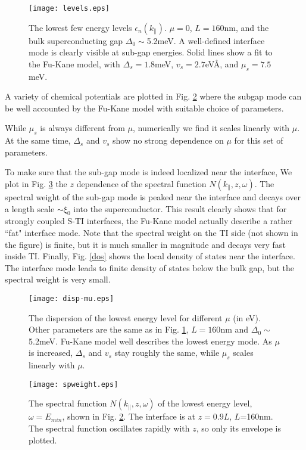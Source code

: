 \documentclass[12pt,twocolumn]{article}
\begin{document}
\begin{figure}
\texttt{[image: levels.eps]}
\caption{The lowest few energy levels $\epsilon_n(k_\parallel)$. 
$\mu=0$, $L=160$nm, and the bulk superconducting gap $\Delta_0\sim$5.2meV.
A well-defined interface mode is clearly visible at sub-gap energies.
Solid lines show a fit to the Fu-Kane model, with $\Delta_s=1.8$meV, 
$v_s=2.7$eV\AA, and $\mu_s=7.5$meV.
}\label{lev-fk}
\end{figure}
A variety of chemical potentials are plotted in Fig. \ref{lev-chem} where the subgap mode can be well accounted by the Fu-Kane 
model with suitable choice of parameters. 

While $\mu_s$ is always different from $\mu$,
numerically we find it scales linearly with $\mu$. At the same time, 
$\Delta_s$ and $v_s$ show no strong dependence on $\mu$ for this set of parameters.

To make sure that the sub-gap mode is indeed localized near the interface, 
We plot in Fig. \ref{sp} the $z$ dependence of the spectral function $N(k_\parallel,z,\omega)$.
%
The spectral weight of the sub-gap mode is peaked near the interface and decays over 
a length scale $\sim \xi_0$ into the superconductor. This result clearly shows
that for strongly coupled S-TI interfaces, the Fu-Kane model actually describe a
rather ``fat" interface mode. Note that the spectral weight on the TI side 
(not shown in the figure) is finite, 
but it is much smaller in magnitude and decays very fast inside TI. Finally,
Fig. \ref{dos} shows the local density of states near the interface.
The interface mode leads to finite density of states below the bulk gap,
but the spectral weight is very small.

\begin{figure}
\texttt{[image: disp-mu.eps]}
\caption{The dispersion of the lowest energy level
for different $\mu$ (in eV). Other parameters
are the same as in Fig. \ref{lev-fk}, $L=160$nm and $\Delta_0\sim$5.2meV. Fu-Kane model
well describes the lowest energy mode. As $\mu$ is increased, 
$\Delta_s$ and $v_s$ stay roughly the same, while $\mu_s$ scales
linearly with $\mu$.
}\label{lev-chem}
\end{figure}

\begin{figure}
\texttt{[image: spweight.eps]}
\caption{The spectral function $N(k_\parallel,z,\omega)$ of the lowest 
energy level, $\omega=E_{min}$, shown in Fig. \ref{lev-chem}. 
The interface is at $z=0.9L$, $L$=160nm.
The spectral function oscillates rapidly with $z$, so only its envelope is plotted.
}\label{sp}
\end{figure}
\end{document}
